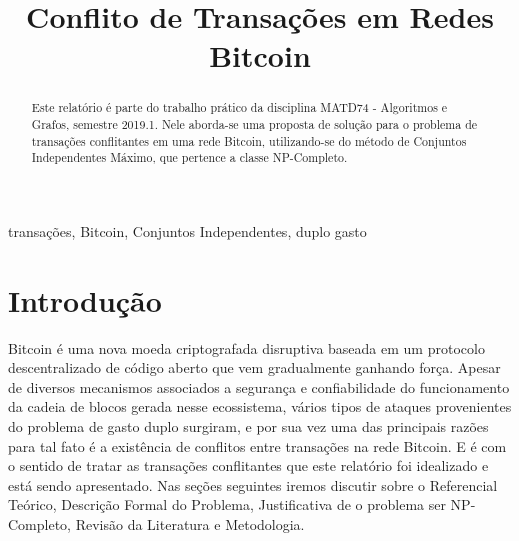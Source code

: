 \documentclass[conference]{IEEEtran}
\begin{document}
\title{Conflito de Transações em Redes Bitcoin\\}

\author{
\and
{}
}

\maketitle

\begin{abstract}
Este relatório é parte do trabalho prático da disciplina MATD74 - Algoritmos e Grafos, semestre 2019.1. Nele aborda-se uma proposta de solução para o problema de transações conflitantes em uma rede Bitcoin, utilizando-se do método de Conjuntos Independentes Máximo, que pertence a classe NP-Completo.
\end{abstract}

\begin{IEEEkeywords}
transações, Bitcoin, Conjuntos Independentes, duplo gasto
\end{IEEEkeywords}

\section{Introdução}

Bitcoin é uma nova moeda criptografada disruptiva baseada em um protocolo descentralizado de código aberto que vem gradualmente ganhando força. Apesar de diversos mecanismos associados a segurança e confiabilidade do funcionamento da cadeia de blocos gerada nesse ecossistema, vários tipos de ataques provenientes do problema de gasto duplo surgiram, e por sua vez uma das principais razões para tal fato é a existência de conflitos entre transações na rede Bitcoin. E é com o sentido de tratar as transações conflitantes que este relatório foi idealizado e está sendo apresentado. Nas seções seguintes iremos discutir sobre o Referencial Teórico, Descrição Formal do Problema, Justificativa de o problema ser NP-Completo, Revisão da Literatura e Metodologia.
\end{document}
